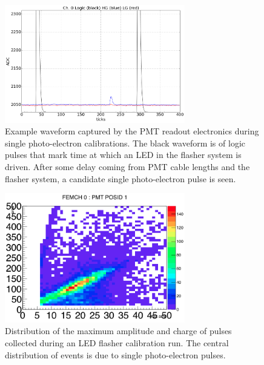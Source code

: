\begin{figure}
\centering 
\includegraphics[width=0.7\textwidth]{./figures/sample_flasher_spe.png}
\caption{Example waveform captured by the PMT readout electronics during single photo-electron calibrations.  The black waveform is of logic pulses that mark time at which an LED in the flasher system is driven.  After some delay coming from PMT cable lengths and the flasher system, a candidate single photo-electron pulse is seen.}
 \label{fig:example_spe_wfm}
 \end{figure}


\begin{figure}
\centering 
\includegraphics[width=0.7\textwidth]{./figures/h2_ch0_pmt1.png}
\caption{Distribution of the maximum amplitude and charge of pulses collected during an LED flasher calibration run. The central distribution of events is due to single photo-electron pulses.}
 \label{fig:example_spe_pulsedist} 
\end{figure}




